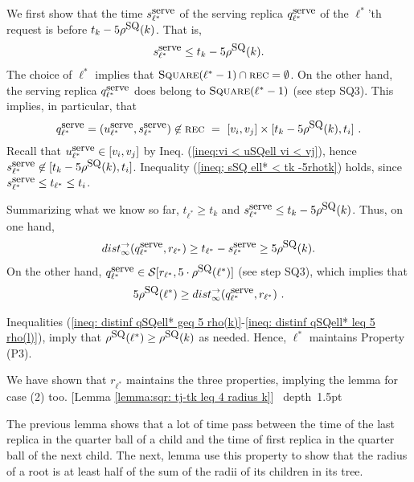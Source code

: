 \documentclass[11pt]{article}
\def\blackslug{\hbox{\hskip 1pt \vrule width 4pt height 8pt
    depth 1.5pt \hskip 1pt}}
\def\QED{\quad\blackslug\lower 8.5pt\null\par}
\newcommand{\calS}{\mathcal{S}}
\newcommand{\Square}[0]{\mbox{\sc Square}}
\newcommand{\rr}{r}
\newcommand{\distinf}[1]{{dist}^{\rightarrow}_{\infty}(#1)}
\newcommand{\qSQ}{q^{\mbox{\small\upshape serve}}}
\newcommand{\uSQ}{u^{\mbox{\small\upshape serve}}}
\newcommand{\sSQ}{s^{\mbox{\small\upshape serve}}}
\newcommand{\rhoSQ}[0]{\rho^{\mbox{\small\upshape SQ}}}
\newcommand{\seq}[1]{\calS[#1]}
\newcommand{\reck}[0]{\mbox{\sc rec}}
\begin{document}
\begin{enumerate}
We first show that the time $\sSQ_{\ell^*}$ of the serving replica $\qSQ_{\ell^*}$ of the $\ell^*$'th request is before $t_k-5\rhoSQ(k)$.
That is,
\begin{eqnarray}
\label{ineq; sSQ ell* < tk -5rhotk}
\sSQ_{\ell^*} \leq t_k-5\rhoSQ(k).
\end{eqnarray}
The choice of $\ell^*$ implies that $\Square(\ell^*-1)\cap\reck=\emptyset$.
On the other hand, the serving replica $\qSQ_{\ell^*}$ does belong to $\Square(\ell^*-1)$ (see step SQ3).
This implies, in particular, that
$$
\qSQ_{\ell^*}=(\uSQ_{\ell^*},\sSQ_{\ell^*})\not\in \reck~=~[v_i,v_j]\times[t_k-5\rhoSQ(k), t_i]~.
$$
Recall that $\uSQ_{\ell^*}\in [v_i,v_j]$ by Ineq. (\ref{ineq:vi < uSQell vi < vj}),
hence $\sSQ_{\ell^*}\not\in [t_k-5\rhoSQ(k), t_i]$.
Inequality (\ref{ineq; sSQ ell* < tk -5rhotk}) holds, since $\sSQ_{\ell^*}\leq t_{\ell^*}\leq t_i$.

Summarizing what we know so far,  $t_{\ell^*}\geq t_k$ and $\sSQ_{\ell^*} \leq t_k-5\rhoSQ(k)$.
Thus, on  one hand,
\begin{eqnarray}
\label{ineq: distinf qSQell* geq 5 rho(k)}
\distinf{\qSQ_{\ell^*},\rr_{\ell^*}} \geq t_{\ell^*}-\sSQ_{\ell^*}\geq 5\rhoSQ(k).
\end{eqnarray}
On the other hand,
$ \qSQ_{\ell^*} \in \seq{r_{\ell^*},5\cdot\rhoSQ(\ell^*)}
$ (see step SQ3),
which implies that
\begin{eqnarray}
\label{ineq: distinf qSQell* leq 5 rho(l)}
5\rhoSQ(\ell^*) \geq \distinf{\qSQ_{\ell^*},\rr_{\ell^*}}~.
\end{eqnarray}

Inequalities (\ref{ineq: distinf qSQell* geq 5 rho(k)}-\ref{ineq: distinf qSQell* leq 5 rho(l)}), imply that $\rhoSQ(\ell^*)\geq \rhoSQ(k)$ as needed.
Hence, $\ell^*$ maintains Property (P3).


\end{enumerate}

\noindent We have shown that $\rr_{\ell^*}$ maintains the three properties, implying the lemma for case (2) too.
[Lemma \ref{lemma:sqr: tj-tk leq 4 radius k}]
\QED









The previous lemma shows that a lot of time pass between the time of the last replica in the quarter ball of a child and the time of first replica in the quarter ball of the next child.
The next, lemma use this property to show that the radius of a root is at least half of the sum of the radii of its children in its tree.
\end{document}
